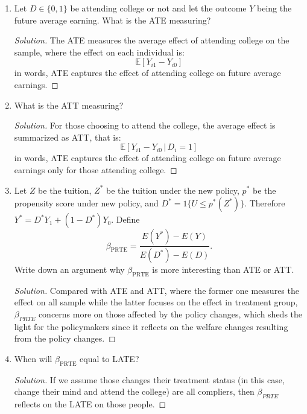 \documentclass[11pt]{article}
\newenvironment{solution}{%
  \renewcommand\qedsymbol{$\blacksquare$}%
  \begin{mdframed}[backgroundcolor=gray!15]%
  \begin{proof}[Solution]}%
  {\end{proof}%
  \end{mdframed}}%
\newcommand{\ept}{\mathbb{E}}
\newcommand{\given}{\,|\,}
\begin{document}
    \begin{enumerate}

        \item Let $D \in \{0,1\}$ be attending college or not and let the outcome $Y$ being the future average earning. What is the ATE measuring?
        
            \begin{solution}
                The ATE measures the average effect of attending college on the sample, where the effect on each individual is:
                \[
                    \ept[Y_{i1} - Y_{i0}]
                \]
                in words, ATE captures the effect of attending college on future average earnings.
            \end{solution}
        
        \item What is the ATT measuring?
        
            \begin{solution}
                For those choosing to attend the college, the average effect is summarized as ATT, that is:
                \[
                    \ept[Y_{i1} - Y_{i0} \given D_i = 1]
                \]
                in words, ATE captures the effect of attending college on future average earnings only for those attending college.
            \end{solution}
        
        \item Let $Z$ be the tuition, $Z^*$ be the tuition under the new policy, $p^*$ be the propensity score under new policy, and $D^* = 1\{U \leq p^*(Z^*)\}$. Therefore $Y^* = D^*Y_1 + (1-D^*)Y_0$. Define
        \[\beta_{\text{PRTE}} = \frac{E(Y^*)-E(Y)}{E(D^*)-E(D)}.\]
        Write down an argument why $\beta_{\text{PRTE}}$ is more interesting than ATE or ATT.

            \begin{solution}
                Compared with ATE and ATT, where the former one measures the effect on all sample while the latter focuses on the effect in treatment group, $\beta_{PRTE}$ concerns more on those affected by the policy changes, which sheds the light for the policymakers since it reflects on the welfare changes resulting from the policy changes.
            \end{solution}
        
        \item When will $\beta_{\text{PRTE}}$ equal to LATE?
        
            \begin{solution}
                If we assume those changes their treatment status (in this case, change their mind and attend the college) are all compliers, then $\beta_{PRTE}$ reflects on the LATE on those people.
            \end{solution}

    \end{enumerate}
\end{document}
